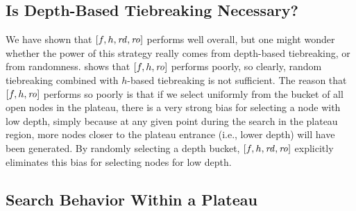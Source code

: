 
\subsection{Is Depth-Based Tiebreaking Necessary?}

We have shown that $[f,h,{\mbox{\textit{rd}}},{\mbox{\textit{ro}}}]$ performs well overall, but
one might wonder whether the power of this strategy really comes from depth-based tiebreaking, or from randomness.
 shows that $[f,h,{\mbox{\textit{ro}}}]$ performs poorly, so clearly, random tiebreaking combined with $h$-based tiebreaking is not sufficient.
The reason that $[f,h,{\mbox{\textit{ro}}}]$ performs so poorly is that if we select uniformly from the bucket of all open nodes in the plateau, there is a very strong bias for selecting a node with low depth, simply because at any given point during the search in the plateau region, more nodes closer to the plateau entrance (i.e., lower depth) will have been generated.
By randomly selecting a depth bucket, $[f,h,{\mbox{\textit{rd}}},{\mbox{\textit{ro}}}]$ explicitly eliminates this bias for selecting nodes for low depth.



\subsection{Search Behavior Within a Plateau}

